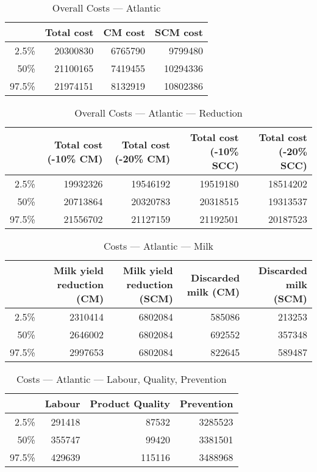 \documentclass{article}\usepackage[]{graphicx}\usepackage[]{color}
\begin{document}
\begin{table}[ht]
\centering
\begin{tabular}{rrrr}
  \hline
 & Total cost & CM cost & SCM cost \\ 
  \hline
2.5\% & 20300830 & 6765790 & 9799480 \\ 
  50\% & 21100165 & 7419455 & 10294336 \\ 
  97.5\% & 21974151 & 8132919 & 10802386 \\ 
   \hline
\end{tabular}
\caption{Overall Costs --- Atlantic} 
\label{tab:atlantic:overall}
\end{table}
\begin{table}[ht]
\centering
\begin{tabular}{rrrrr}
  \hline
 & Total cost (-10\% CM) & Total cost (-20\% CM) & Total cost (-10\% SCC) & Total cost (-20\% SCC) \\ 
  \hline
2.5\% & 19932326 & 19546192 & 19519180 & 18514202 \\ 
  50\% & 20713864 & 20320783 & 20318515 & 19313537 \\ 
  97.5\% & 21556702 & 21127159 & 21192501 & 20187523 \\ 
   \hline
\end{tabular}
\caption{Overall Costs --- Atlantic --- Reduction} 
\label{tab:atlantic:reduction}
\end{table}
\begin{table}[ht]
\centering
\begin{tabular}{rrrrr}
  \hline
 & Milk yield reduction (CM) & Milk yield reduction (SCM) & Discarded milk (CM) & Discarded milk (SCM) \\ 
  \hline
2.5\% & 2310414 & 6802084 & 585086 & 213253 \\ 
  50\% & 2646002 & 6802084 & 692552 & 357348 \\ 
  97.5\% & 2997653 & 6802084 & 822645 & 589487 \\ 
   \hline
\end{tabular}
\caption{Costs --- Atlantic --- Milk} 
\label{tab:atlantic:a}
\end{table}
\begin{table}[ht]
\centering
\begin{tabular}{rrrr}
  \hline
 & Labour & Product Quality & Prevention \\ 
  \hline
2.5\% & 291418 & 87532 & 3285523 \\ 
  50\% & 355747 & 99420 & 3381501 \\ 
  97.5\% & 429639 & 115116 & 3488968 \\ 
   \hline
\end{tabular}
\caption{Costs --- Atlantic --- Labour, Quality, Prevention} 
\label{tab:atlantic:b}
\end{table}
\end{document}
